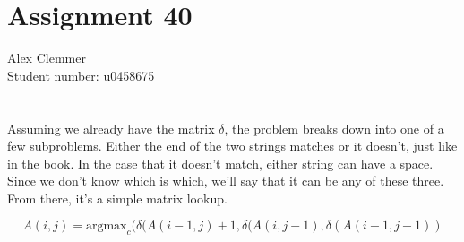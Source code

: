 \documentclass[a4paper]{article}
\begin{document}
\section*{Assignment 40}
Alex Clemmer\\
Student number: u0458675

\section{}

Assuming we already have the matrix $\delta$, the problem breaks down into one of a few subproblems. Either the end of the two strings matches or it doesn't, just like in the book. In the case that it doesn't match, either string can have a space. Since we don't know which is which, we'll say that it can be any of these three. From there, it's a simple matrix lookup.

\begin{equation}
A(i,j) = \mbox{argmax}_c(\delta(A(i-1,j) + 1, \delta(A(i, j-1), \delta(A(i-1,j-1))
\end{equation}
\end{document}
